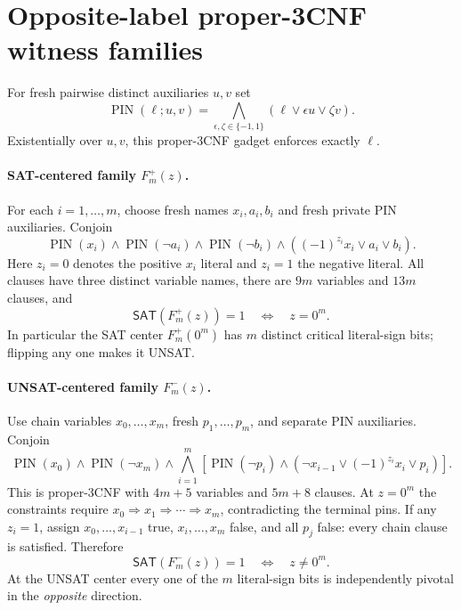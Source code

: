 \documentclass[11pt]{article}
\newcommand{\SAT}{\mathsf{SAT}}
\begin{document}
\section{Opposite-label proper-3CNF witness families}
For fresh pairwise distinct auxiliaries $u,v$ set
\[
 \operatorname{PIN}(\ell;u,v)=
  \bigwedge_{\epsilon,\zeta\in\{-1,1\}}
  (\ell\vee \epsilon u\vee\zeta v).
\]
Existentially over $u,v$, this proper-3CNF gadget enforces
exactly $\ell$.

\paragraph{SAT-centered family $F_m^+(z)$.}
For each $i=1,\ldots,m$, choose fresh names $x_i,a_i,b_i$
and fresh private PIN auxiliaries. Conjoin
\[
 \operatorname{PIN}(x_i)\wedge
 \operatorname{PIN}(\neg a_i)\wedge
 \operatorname{PIN}(\neg b_i)\wedge
 ((-1)^{z_i}x_i\vee a_i\vee b_i).
\]
Here $z_i=0$ denotes the positive $x_i$ literal and $z_i=1$
the negative literal. All clauses have three distinct variable
names, there are $9m$ variables and $13m$ clauses, and
\[
 \SAT(F_m^+(z))=1\quad\Longleftrightarrow\quad z=0^m.
\]
In particular the SAT center $F_m^+(0^m)$ has $m$ distinct
critical literal-sign bits; flipping any one makes it UNSAT.

\paragraph{UNSAT-centered family $F_m^-(z)$.}
Use chain variables $x_0,\ldots,x_m$, fresh $p_1,\ldots,p_m$,
and separate PIN auxiliaries. Conjoin
\[
 \operatorname{PIN}(x_0)\wedge
 \operatorname{PIN}(\neg x_m)\wedge
 \bigwedge_{i=1}^m
 \left[
 \operatorname{PIN}(\neg p_i)\wedge
 (\neg x_{i-1}\vee(-1)^{z_i}x_i\vee p_i)
 \right].
\]
This is proper-3CNF with $4m+5$ variables and $5m+8$
clauses. At $z=0^m$ the constraints require
$x_0\Rightarrow x_1\Rightarrow\cdots\Rightarrow x_m$,
contradicting the terminal pins. If any $z_i=1$, assign
$x_0,\ldots,x_{i-1}$ true, $x_i,\ldots,x_m$ false, and
all $p_j$ false: every chain clause is satisfied. Therefore
\[
 \SAT(F_m^-(z))=1\quad\Longleftrightarrow\quad z\ne0^m.
\]
At the UNSAT center every one of the $m$ literal-sign bits
is independently pivotal in the \emph{opposite} direction.
\end{document}
